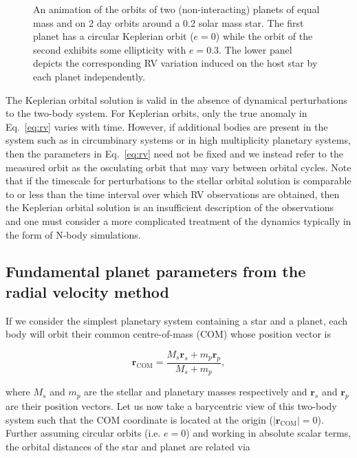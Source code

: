 \begin{figure}
  \centering
  \caption[Animation of observed radial velocities for different orbital configurations.]
      {An animation of the orbits of two (non-interacting) planets of equal
    mass and on 2 day orbits around a 0.2 solar mass star. The first planet has a circular
    Keplerian orbit ($e=0$) while the orbit of the second exhibits some ellipticity with
    $e=0.3$. The lower panel depicts the corresponding RV variation induced on the host star
    by each planet independently.}
  \label{fig:rv}
\end{figure}

The Keplerian orbital solution is valid in the absence of dynamical 
perturbations to the two-body system. For Keplerian orbits, only the true anomaly in
Eq.~\ref{eq:rv} varies with time. However,
if additional bodies are present in the system such as in circumbinary  
systems or in high multiplicity planetary systems, then the parameters in 
Eq.~\ref{eq:rv} need not be fixed and we instead refer to the measured orbit as the 
osculating orbit that may vary between orbital cycles. Note that if the timescale 
for perturbations to the stellar orbital solution is comparable to or less than the 
time interval over which RV observations are obtained, then the Keplerian 
orbital solution is an insufficient description of the observations and one must consider
a more complicated treatment of the dynamics typically in the form of N-body simulations.


\subsection{Fundamental planet parameters from the radial velocity method} \label{sect:K}
If we consider the simplest planetary system containing a star and a planet, each body will 
orbit their common centre-of-mass (COM) whose position vector is

\begin{equation}
\mathbf{r}_{\mathrm{COM}} = \frac{M_s \mathbf{r}_s + m_p \mathbf{r}_p}{M_s + m_p},
\end{equation}

\noindent where $M_s$ and $m_p$ are the stellar and planetary masses respectively and
$\mathbf{r}_s$ and $\mathbf{r}_p$ are their position vectors. 
Let us now take a barycentric view of this two-body system such that the 
COM coordinate is located at the origin ($|\mathbf{r}_{\mathrm{COM}}|=0$). Further
assuming circular orbits (i.e. $e=0$) and working 
in absolute scalar terms, the orbital distances of the star and planet are  
related via 

